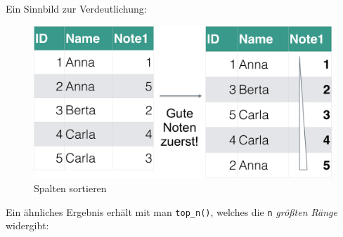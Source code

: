 \documentclass[12pt,ngerman,]{book}
\begin{document}
Ein Sinnbild zur Verdeutlichung:

\begin{figure}

{\centering \includegraphics[width=0.7\linewidth]{images/Datenjudo/arrange} 

}

\caption{Spalten sortieren}\label{fig:fig-arrange}
\end{figure}

Ein ähnliches Ergebnis erhält mit man \texttt{top\_n()}, welches die
\texttt{n} \emph{größten Ränge} widergibt:
\end{document}

